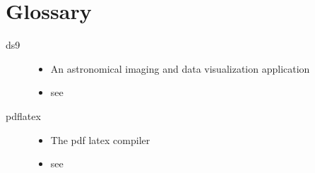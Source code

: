 \documentclass[a4paper,10pt,english]{report}
\begin{document}
\section{Glossary}
\label{\detokenize{misc/glossary:id1}}\begin{description}
\item[{ds9\label{\detokenize{misc/glossary:term-ds9}}}] \leavevmode\begin{itemize}
\item {} 
An astronomical imaging and data visualization application

\item {} 
see 

\end{itemize}

\item[{pdflatex\label{\detokenize{misc/glossary:term-pdflatex}}}] \leavevmode\begin{itemize}
\item {} 
The pdf latex compiler

\item {} 
see 

\end{itemize}

\end{description}



\renewcommand{\indexname}{Index}
\printindex
\end{document}
